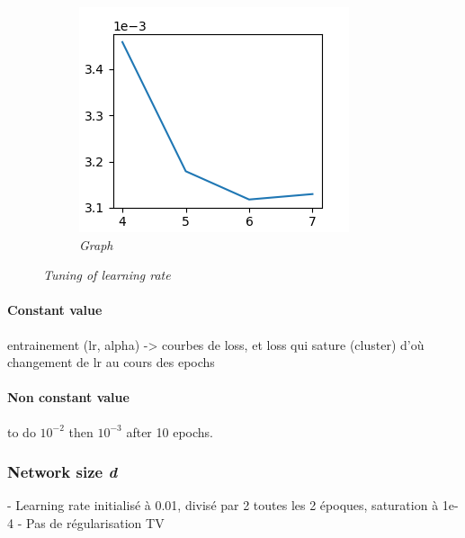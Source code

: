 \documentclass{article}
\begin{document}
\begin{figure}[!ht]
\begin{subfigure}{.33\linewidth}
                    \includegraphics[width=.8\linewidth]{pics/hpp-d.png}
                    \caption{\textit{Graph}}
                \end{subfigure}
                \caption{\textit{Tuning of learning rate}}
            \end{figure}


            \paragraph{Constant value}
            entrainement (lr, alpha) -> courbes de loss, et loss qui sature (cluster) d'où changement de lr au cours des epochs
            \paragraph{Non constant value}
            to do
        $10^{-2}$ then $10^{-3}$ after 10 epochs.
        \subsubsection{Network size \textit{d}}
            - Learning rate initialisé à 0.01, divisé par 2 toutes les 2 époques, saturation à 1e-4
            - Pas de régularisation TV
\end{document}
